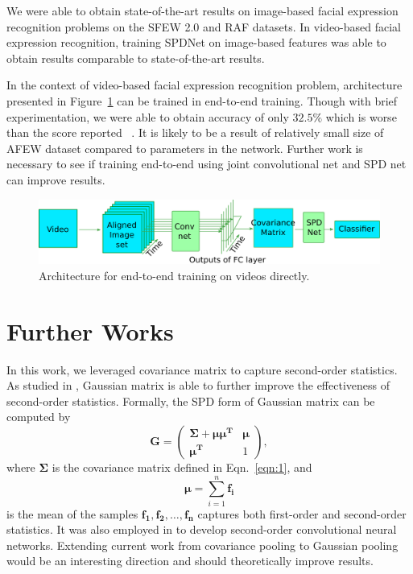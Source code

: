 \documentclass[10pt,twocolumn,letterpaper]{article}
\begin{document}
		We were able to obtain state-of-the-art results on image-based facial expression recognition problems on the SFEW 2.0 and RAF datasets. In video-based facial expression recognition, training SPDNet on image-based features was able to obtain results comparable to state-of-the-art results.
		
		In the context of video-based facial expression recognition problem, architecture presented in Figure~\ref{fig:e2e} can be trained in end-to-end training. Though with brief experimentation, we were able to obtain accuracy of only $32.5\%$ which is worse than the score reported ~\cite{spdnet}. It is likely to be a result of relatively small size of AFEW dataset compared to parameters in the network. Further work is necessary to see if training end-to-end using joint convolutional net and SPD net can improve results.
		\begin{figure}[h]
			\begin{center}
				\rule{0pt}{.2in}
					\includegraphics[width=.9\linewidth,keepaspectratio]{res/end2endarch}
			\end{center}
			\caption{Architecture for end-to-end training on videos directly.}
			\label{fig:e2e}
		\end{figure}
		
		\section{Further Works}
		
		In this work, we leveraged covariance matrix to capture second-order statistics. As studied in \cite{huang2015log}, Gaussian matrix is able to further improve the effectiveness of second-order statistics. Formally, the SPD form of Gaussian matrix can be computed by 
		\begin{equation}
		\mathbf{G}=\begin{pmatrix}
		\mathbf{\Sigma}+\mathbf{\mu}\mathbf{\mu^T} & \mathbf{\mu} \\
		\mathbf{\mu^T} & 1
		\end{pmatrix},
		\end{equation}
		where $\mathbf{\Sigma}$ is the covariance matrix defined in Eqn.~\ref{eqn:1}, and 
		\begin{equation}
		\mathbf{\mu}=\sum_{i=1}^{n}\mathbf{f_i} 
		\end{equation} is the mean of the samples $\mathbf{f_1},\mathbf{f_2},\dots,\mathbf{f_n}$ captures both first-order and second-order statistics. It was also employed in \cite{epfl} to develop second-order convolutional neural networks. Extending current work from covariance pooling to Gaussian pooling would be an interesting direction and should theoretically improve results.

		

{\small


}
\end{document}

